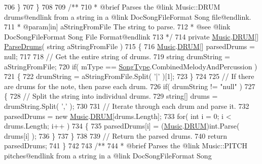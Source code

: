 \begin{DoxyCodeInclude}
706         \}
707     \}
708 \textcolor{comment}{}
709 \textcolor{comment}{    /** }
710 \textcolor{comment}{     * @brief Parses the @link Music::DRUM drums@endlink from a string in a @link DocSongFileFormat Song
       file@endlink.}
711 \textcolor{comment}{     * @param[in] aStringFromFile The string to parse.}
712 \textcolor{comment}{     * @see @link DocSongFileFormat Song File Format@endlink}
713 \textcolor{comment}{    */}
714     \textcolor{keyword}{private} \hyperlink{class_music}{Music}.\hyperlink{group___music_enums_gade475b4382c7066d1af13e7c13c029b6}{DRUM}[] \hyperlink{group___song_priv_func_gaaa4ca12f0885a34cbfb09bb7a1db178b}{ParseDrums}( \textcolor{keywordtype}{string} aStringFromFile )
715     \{
716         \hyperlink{class_music}{Music}.\hyperlink{group___music_enums_gade475b4382c7066d1af13e7c13c029b6}{DRUM}[] parsedDrums = null;
717 
718         \textcolor{comment}{// Get the entire string of drums.}
719         \textcolor{keywordtype}{string} drumString = aStringFromFile;
720         \textcolor{keywordflow}{if}( mType == \hyperlink{group___song_enums_gae681a1f001333e39fc1cb4fea97bfe1b}{SongType}.CombinedMelodyAndPercussion )
721         \{
722             drumString = aStringFromFile.Split( \textcolor{charliteral}{'|'} )[1];
723         \}
724 
725         \textcolor{comment}{// If there are drums for the note, then parse each drum.}
726         \textcolor{keywordflow}{if}( drumString != \textcolor{stringliteral}{"null"} )
727         \{
728             \textcolor{comment}{// Split the string into individual drums.}
729             \textcolor{keywordtype}{string}[] drums = drumString.Split( \textcolor{charliteral}{','} );
730 
731             \textcolor{comment}{// Iterate through each drum and parse it.}
732             parsedDrums = \textcolor{keyword}{new} \hyperlink{class_music}{Music}.\hyperlink{group___music_enums_gade475b4382c7066d1af13e7c13c029b6}{DRUM}[drums.Length];
733             \textcolor{keywordflow}{for}( \textcolor{keywordtype}{int} i = 0; i < drums.Length; i++ )
734             \{
735                 parsedDrums[i] = (\hyperlink{class_music}{Music}.\hyperlink{group___music_enums_gade475b4382c7066d1af13e7c13c029b6}{DRUM})\textcolor{keywordtype}{int}.Parse( drums[i] );
736             \}
737         \}
738 
739         \textcolor{comment}{// Return the parsed drums.}
740         \textcolor{keywordflow}{return} parsedDrums;
741     \}
742 \textcolor{comment}{}
743 \textcolor{comment}{    /** }
744 \textcolor{comment}{     * @brief Parses the @link Music::PITCH pitches@endlink from a string in a @link DocSongFileFormat Song
}
\end{DoxyCodeInclude}
